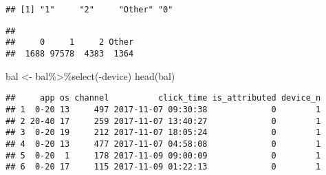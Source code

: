 \documentclass[
]{article}
\newenvironment{Shaded}{\begin{snugshade}}{\end{snugshade}}
\newcommand{\AttributeTok}[1]{\textcolor[rgb]{0.77,0.63,0.00}{#1}}
\newcommand{\ControlFlowTok}[1]{\textcolor[rgb]{0.13,0.29,0.53}{\textbf{#1}}}
\newcommand{\DecValTok}[1]{\textcolor[rgb]{0.00,0.00,0.81}{#1}}
\newcommand{\FunctionTok}[1]{\textcolor[rgb]{0.00,0.00,0.00}{#1}}
\newcommand{\NormalTok}[1]{#1}
\newcommand{\OtherTok}[1]{\textcolor[rgb]{0.56,0.35,0.01}{#1}}
\newcommand{\SpecialCharTok}[1]{\textcolor[rgb]{0.00,0.00,0.00}{#1}}
\newcommand{\StringTok}[1]{\textcolor[rgb]{0.31,0.60,0.02}{#1}}
\begin{document}
\begin{Shaded}
\end{Shaded}

\begin{verbatim}
## [1] "1"     "2"     "Other" "0"
\end{verbatim}

\begin{Shaded}
\end{Shaded}

\begin{verbatim}
## 
##     0     1     2 Other 
##  1688 97578  4383  1364
\end{verbatim}

\begin{Shaded}
\begin{Highlighting}[]
\NormalTok{bal }\OtherTok{\textless{}{-}}\NormalTok{ bal}\SpecialCharTok{\%\textgreater{}\%}\FunctionTok{select}\NormalTok{(}\SpecialCharTok{{-}}\NormalTok{device)}
\FunctionTok{head}\NormalTok{(bal)}
\end{Highlighting}
\end{Shaded}

\begin{verbatim}
##     app os channel          click_time is_attributed device_n
## 1  0-20 13     497 2017-11-07 09:30:38             0        1
## 2 20-40 17     259 2017-11-07 13:40:27             0        1
## 3  0-20 19     212 2017-11-07 18:05:24             0        1
## 4  0-20 13     477 2017-11-07 04:58:08             0        1
## 5  0-20  1     178 2017-11-09 09:00:09             0        1
## 6  0-20 17     115 2017-11-09 01:22:13             0        1
\end{verbatim}
\end{document}
